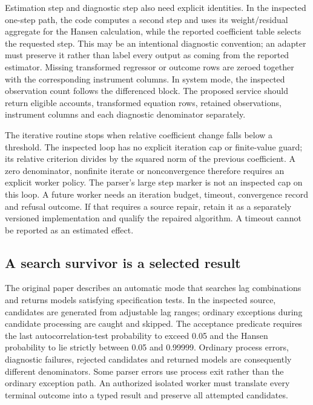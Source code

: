 Estimation step and diagnostic step also need explicit identities. In the inspected
one-step path, the code computes a second step and uses its weight/residual aggregate
for the Hansen calculation, while the reported coefficient table selects the requested
step. This may be an intentional diagnostic convention; an adapter must preserve it
rather than label every output as coming from the reported estimator. Missing transformed
regressor or outcome rows are zeroed together with the corresponding instrument columns.
In system mode, the inspected observation count follows the differenced block. The
proposed service should return eligible accounts, transformed equation rows, retained
observations, instrument columns and each diagnostic denominator separately.
\citep{exec24_pydynpd_source}

The iterative routine stops when relative coefficient change falls below a threshold.
The inspected loop has no explicit iteration cap or finite-value guard; its relative
criterion divides by the squared norm of the previous coefficient. A zero denominator,
nonfinite iterate or nonconvergence therefore requires an explicit worker policy.
The parser's large step marker is not an inspected cap on this loop. A future worker
needs an iteration budget, timeout, convergence record and refusal outcome. If that
requires a source repair, retain it as a separately versioned implementation and
qualify the repaired algorithm. A timeout cannot be reported as an estimated effect.
\citep{exec24_pydynpd_source}

\subsection{A search survivor is a selected result}
The original paper describes an automatic mode that searches lag combinations and
returns models satisfying specification tests. In the inspected source, candidates
are generated from adjustable lag ranges; ordinary exceptions during candidate
processing are caught and skipped. The acceptance predicate requires the last
autocorrelation-test probability to exceed 0.05 and the Hansen probability to lie
strictly between 0.05 and 0.99999. Ordinary process errors, diagnostic failures,
rejected candidates and returned models are consequently different denominators.
Some parser errors use process exit rather than the ordinary exception path.
An authorized isolated worker must translate every terminal outcome into a typed
result and preserve all attempted candidates.~\citep{exec24_pydynpd_paper,exec24_pydynpd_source}

